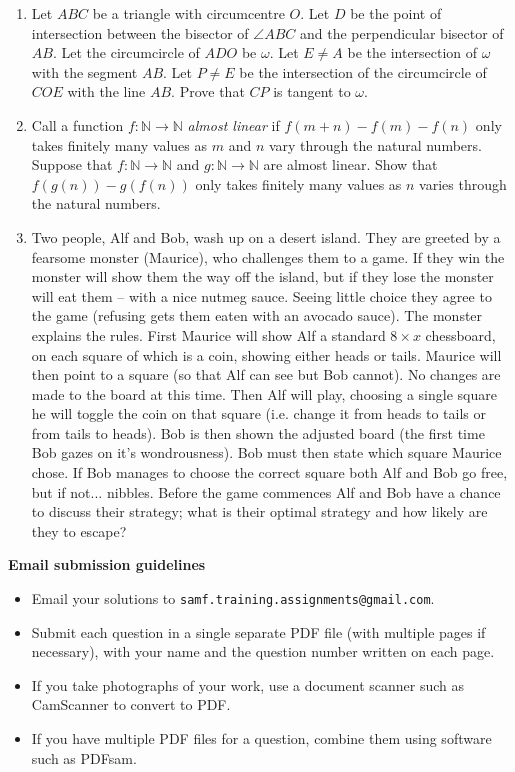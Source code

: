 \documentclass{article}
\begin{document}
\begin{enumerate}[1.]
\vspace{6pt}
\item %
Let $ABC$ be a triangle with circumcentre $O$. Let $D$ be the point of intersection between the bisector of $\angle ABC$ and the perpendicular bisector of $AB$. Let the circumcircle of $ADO$ be $\omega$. Let $E\neq A$ be the intersection of $\omega$ with the segment $AB$. Let $P\neq E$ be the intersection of the circumcircle of $COE$ with the line $AB$. Prove that $CP$ is tangent to $\omega$.


\vspace{6pt}
\item %
Call a function $f : \mathbb{N} \to \mathbb{N}$ \emph{almost linear} if $f(m + n) - f(m) - f(n)$ only takes finitely many values as $m$ and $n$ vary through the natural numbers. Suppose that $f : \mathbb{N} \to \mathbb{N}$ and $g : \mathbb{N} \to \mathbb{N}$ are almost linear. Show that $f(g(n)) - g(f(n))$ only takes finitely many values as $n$ varies through the natural numbers.


\vspace{6pt}
\item %
Two people, Alf and Bob, wash up on a desert island. They are greeted by a fearsome monster (Maurice), who challenges them to a game. If they win the monster will show them the way off the island, but if they lose the monster will eat them -- with a nice nutmeg sauce. Seeing little choice they agree to the game (refusing gets them eaten with an avocado sauce). The monster explains the rules. First Maurice will show Alf a standard $8 \times x$ chessboard, on each square of which is a coin, showing either heads or tails. Maurice will then point to a square (so that Alf can see but Bob cannot). No changes are made to the board at this time. Then Alf will play, choosing a single square he will toggle the coin on that square (i.e. change it from heads to tails or from tails to heads). Bob is then shown the adjusted board (the first time Bob gazes on it's wondrousness). Bob must then state which square Maurice chose. If Bob manages to choose the correct square both Alf and Bob go free, but if not... nibbles. Before the game commences Alf and Bob have a chance to discuss their strategy; what is their optimal strategy and how likely are they to escape?


\end{enumerate}

\vfill
\textbf{\Large Email submission guidelines}
\begin{itemize}
	\item Email your solutions to \verb!samf.training.assignments@gmail.com!.
	\item Submit each question in a single separate PDF file (with multiple pages if necessary), with your name and the question number written on each page.
	\item If you take photographs of your work, use a document scanner such as CamScanner to convert to PDF.
	\item If you have multiple PDF files for a question, combine them using software such as PDFsam.
\end{itemize}
\end{document}
